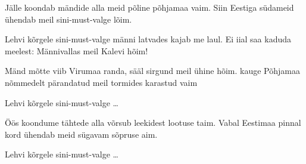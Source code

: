J\"alle koondab m\"andide alla
meid p\~oline p\~ohjamaa vaim.
Siin Eestiga s\"udameid \"uhendab
meil sini-must-valge l\~oim.

Lehvi k\~orgele sini-must-valge
m\"anni latvades kajab me laul.
Ei iial saa kaduda meelest:
M\"annivallas meil Kalevi h\~oim!

M\"and m\~otte viib Virumaa randa,
s\"a\"al sirgund meil \"uhine h\~oim.
kauge P\~ohjamaa n\~ommedelt p\"arandatud
meil tormides karastud vaim

Lehvi k\~orgele sini-must-valge \ldots

\"O\"os koondume t\"ahtede alla
v\~orsub leekidest lootuse taim.
Vabal Eestimaa pinnal kord \"uhendab
meid s\"ugavam s\~opruse aim.

Lehvi k\~orgele sini-must-valge \ldots